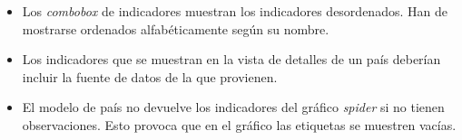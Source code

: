 \begin{itemize}
	\item Los \textit{combobox} de indicadores muestran los indicadores desordenados.  Han de mostrarse ordenados alfabéticamente según su nombre.
	\item Los indicadores que se muestran en la vista de detalles de un país deberían incluir la fuente de datos de la que provienen.
	\item El modelo de país no devuelve los indicadores del gráfico \textit{spider} si no tienen observaciones.  Esto provoca que en el gráfico las etiquetas se muestren vacías.
\end{itemize}
